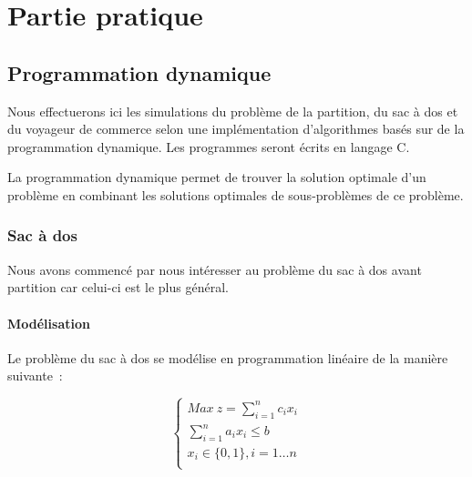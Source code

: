 \documentclass[a4paper, 12pt]{article}
\begin{document}
\pagebreak

\section{Partie pratique}

\subsection{Programmation dynamique}

Nous effectuerons ici les simulations du problème de la partition, du sac
à dos et du voyageur de commerce selon une implémentation
d'algorithmes basés sur de la programmation dynamique. Les programmes
seront écrits en langage C.

La programmation dynamique permet de trouver la solution optimale d'un
problème en combinant les solutions optimales de sous-problèmes de ce
problème.

\subsubsection{Sac à dos}

Nous avons commencé par nous intéresser au problème du sac à dos avant
partition car celui-ci est le plus général.

\paragraph{Modélisation}

Le problème du sac à dos se modélise en programmation linéaire de la
manière suivante~:

\begin{equation}
\begin{cases}
Max~z=\sum_{i=1}^nc_ix_i \\
\sum_{i=1}^na_ix_i \leq b \\
x_i \in\{0, 1\}, i=1\dots n\\
\end{cases}
\end{equation}

\end{document}

